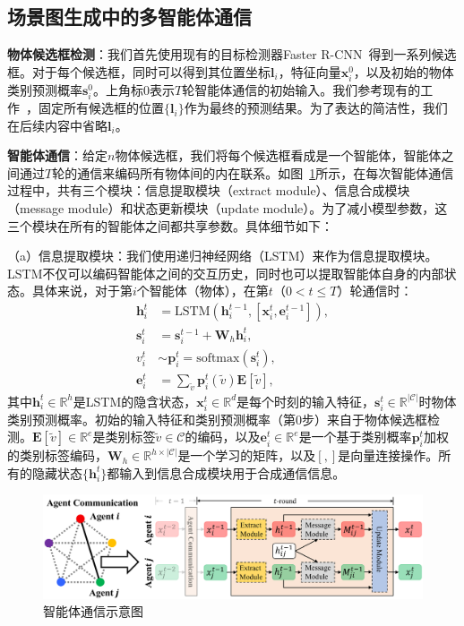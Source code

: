 \subsection{场景图生成中的多智能体通信}

\textbf{物体候选框检测}：我们首先使用现有的目标检测器Faster R-CNN~\cite{ren2015faster}得到一系列候选框。对于每个候选框，同时可以得到其位置坐标$\bm{l}_i$，特征向量$\bm{x}^0_i$，以及初始的物体类别预测概率$\bm{s}^0_i$。上角标$0$表示$T$轮智能体通信的初始输入。我们参考现有的工作~\cite{xu2017scene, zellers2018neural}，固定所有候选框的位置$\{\bm{l}_i\}$作为最终的预测结果。为了表达的简洁性，我们在后续内容中省略$\bm{l}_i$。


\textbf{智能体通信}：给定$n$物体候选框，我们将每个候选框看成是一个智能体，智能体之间通过$T$轮的通信来编码所有物体间的内在联系。如图~\ref{ch4:fig:communication}所示，在每次智能体通信过程中，共有三个模块：信息提取模块（extract module）、信息合成模块（message module）和状态更新模块（update module）。为了减小模型参数，这三个模块在所有的智能体之间都共享参数。具体细节如下：

（a）信息提取模块：我们使用递归神经网络（LSTM）来作为信息提取模块。LSTM不仅可以编码智能体之间的交互历史，同时也可以提取智能体自身的内部状态。具体来说，对于第$i$个智能体（物体），在第$t$（$0 < t \leqslant T$）轮通信时：
\begin{equation}
\begin{aligned}
    \bm{h}^{t}_i & = \text{LSTM}(\bm{h}^{t-1}_i, [\bm{x}^{t}_i, \bm{e}^{t-1}_i]), \\
    \bm{s}^t_i & = \bm{s}^{t-1}_i + \bm{W}_h \bm{h}^{t}_i, \\
    v^t_i & \sim \bm{p}^{t}_i = \text{softmax}(\bm{s}^t_i), \\
    \bm{e}^{t}_i &= \textstyle{\sum_{\tilde{v}}} \bm{p}^{t}_i(\tilde{v}) \mathbf{E}[\tilde{v}],
\end{aligned}
\end{equation}
其中$\bm{h}^t_i \in \mathbb{R}^h$是LSTM的隐含状态，$\bm{x}^t_i \in \mathbb{R}^d$是每个时刻的输入特征，$\bm{s}^t_i \in \mathbb{R}^{|\mathcal{C}|}$时物体类别预测概率。初始的输入特征和类别预测概率（第$0$步）来自于物体候选框检测。$\mathbf{E}[\tilde{v}] \in \mathbb{R}^e$是类别标签$\tilde{v} \in \mathcal{C}$的编码，以及$\bm{e}^{t}_i \in \mathbb{R}^e$是一个基于类别概率$\bm{p}^t_i$加权的类别标签编码，$\bm{W}_h \in \mathbb{R}^{h \times |\mathcal{C}|}$是一个学习的矩阵，以及$[,]$是向量连接操作。所有的隐藏状态$\{\bm{h}^t_i\}$都输入到信息合成模块用于合成通信信息。

\begin{figure}[htbp]
    \centering
    \includegraphics[width=\linewidth]{chapter4/res/communication.pdf}
    \caption{智能体通信示意图}
    \label{ch4:fig:communication}
\end{figure}

